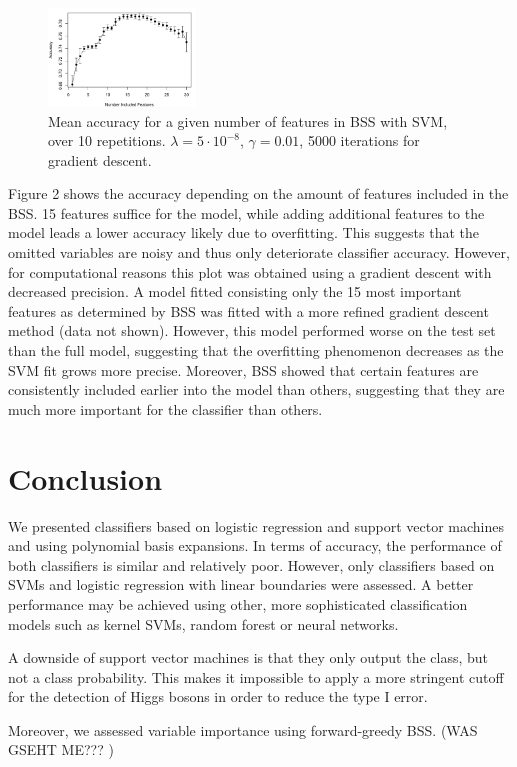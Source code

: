 \documentclass[10pt,conference,compsocconf]{IEEEtran}
\begin{document}
\par
\begin{figure}[H]
	\centering
	\includegraphics[width=0.35\textwidth]{accuracy_plot.pdf}
	\caption{Mean accuracy for a given number of features in BSS with SVM, over 10 repetitions. $\lambda = 5 \cdot 10^{-8}$, $\gamma = 0.01$, 5000 iterations for gradient descent.}
\end{figure}
Figure 2 shows the accuracy depending on the amount of features included in the BSS. 15 features suffice for the model, while adding additional features to the model leads a lower accuracy likely due to overfitting. This suggests that the omitted variables are noisy and thus only deteriorate classifier accuracy.
However, for computational reasons this plot was obtained using a gradient descent with decreased precision. A model fitted consisting only the 15 most important features as determined by BSS was fitted with a more refined gradient descent method (data not shown). However, this model performed worse on the test set than the full model, suggesting that the overfitting phenomenon decreases as the SVM fit grows more precise.
Moreover, BSS showed that certain features are consistently included earlier into the model than others, suggesting that they are much more important for the classifier than others. 
\section*{Conclusion}
We presented classifiers based on logistic regression and support vector machines and using polynomial basis expansions. In terms of accuracy, the performance of both classifiers is similar and relatively poor. However, only classifiers based on SVMs and logistic regression with linear boundaries were assessed. A better performance may be achieved using other, more sophisticated classification models such as kernel SVMs, random forest or neural networks. 
\par
A downside of support vector machines is that they only output the class, but not a class probability. This makes it impossible to apply a more stringent cutoff for the detection of Higgs bosons in order to reduce the type I error. 
\par
Moreover, we assessed variable importance using forward-greedy BSS. (WAS GSEHT ME??? ) 


\end{document}
